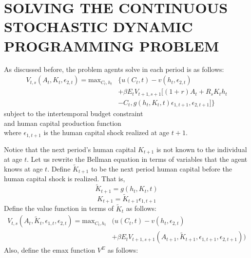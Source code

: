 \documentclass{article}
\begin{document}
\section{SOLVING THE CONTINUOUS STOCHASTIC DYNAMIC PROGRAMMING PROBLEM}
\label{section:solving}
As discussed before, the problem agents solve in each period is as follows:
\begin{equation} \tag{5'}
  \begin{split}
      V_{t,s}(A_t,K_t,\epsilon_{2,t})=\text{max}_{C_t,h_t} & \{u(C_t,t)-v(h_t, \epsilon_{2,t}) \\ & + \beta E_t V_{t+1,s+1}[(1+r)A_t + R_s K_t h_t \\ & -C_t, g(h_t,K_t,t)\epsilon_{1,t+1}, \epsilon_{2,t+1}]\}
  \end{split}
\end{equation}
subject to the intertemporal budget constraint
\begin{equation} \tag{2}
  \label{eq:bc}
 
\end{equation}
and human capital production function
\begin{equation} \tag{4}

\end{equation}
where $\epsilon_{1,t+1}$ is the human capital shock realized at age $t+1$.\par
Notice that the next period's human capital $K_{t+1}$ is not known to the individual at age $t$. Let us rewrite the Bellman equation in terms of variables that the agent knows at age $t$. Define $\tilde{K}_{t+1}$ to be the next period human capital before the human capital shock is realized. That is,
\begin{equation*}
  \tilde{K}_{t+1} = g(h_t, K_t,t)
\end{equation*}
\begin{equation*}
  K_{t+1} =  \tilde{K}_{t+1} \epsilon_{1,t+1}
\end{equation*}
Define the value function in terms of $ \tilde{K}_t$ as follows:
\begin{equation*}
  \begin{split}
      V_{t,s}(A_t,\tilde{K}_t,\epsilon_{1,t},\epsilon_{2,t})=\text{max}_{C_t,h_t} & (u(C_t,t)-v(h_t, \epsilon_{2,t}) \\ & + \beta E_t V_{t+1,s+1} (A_{t+1},\tilde{K}_{t+1},\epsilon_{1,t+1},\epsilon_{2,t+1}))
  \end{split}
\end{equation*}
Also, define the emax function $V^E$ as follows:
\begin{equation*}

\end{equation*}
\end{document}
